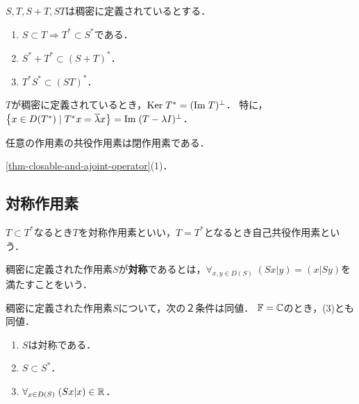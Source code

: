 \documentclass[uplatex,dvipdfmx]{jsreport}
\begin{document}
\begin{lemma}
    $S,T,S+T,ST$は稠密に定義されているとする．
    \begin{enumerate}
        \item $S\subset T\Rightarrow T^*\subset S^*$である．
        \item $S^*+T^*\subset(S+T)^*$．
        \item $T^*S^*\subset(ST)^*$．
    \end{enumerate}
\end{lemma}

\begin{lemma}
    $T$が稠密に定義されているとき，$\mathrm{Ker}\; T^*=(\mathrm{Im}\; T)^\perp$．
    特に，$\left\{x\in D(T^*)\mid T^*x=\overline{\lambda}x\right\}=\mathrm{Im}\;(T-\lambda I)^\perp$．
\end{lemma}

\begin{lemma}
    任意の作用素の共役作用素は閉作用素である．
\end{lemma}
\begin{Proof}
    \ref{thm-closable-and-ajoint-operator}(1)．
\end{Proof}

\subsection{対称作用素}

\begin{tcolorbox}[colframe=ForestGreen, colback=ForestGreen!10!white,breakable,colbacktitle=ForestGreen!40!white,coltitle=black,fonttitle=\bfseries\sffamily,
title=]
    $T\subset T^*$なるとき$T$を対称作用素といい，$T=T^*$となるとき自己共役作用素という．
\end{tcolorbox}

\begin{definition}[symmetric]
    稠密に定義された作用素$S$が\textbf{対称}であるとは，$\forall_{x,y\in D(S)}\;(Sx|y)=(x|Sy)$を満たすことをいう．
\end{definition}

\begin{lemma}[対称作用素の随伴による特徴付け]
    稠密に定義された作用素$S$について，次の２条件は同値．
    $\mathbb{F}=\mathbb{C}$のとき，(3)とも同値．
    \begin{enumerate}
        \item $S$は対称である．
        \item $S\subset S^*$．
        \item $\forall_{x\in D(S)}\;(Sx|x)\in\mathbb{R}$．
    \end{enumerate}
\end{lemma}
\end{document}
